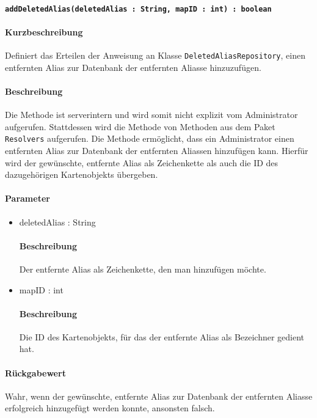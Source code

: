 \paragraph*{\texttt{addDeletedAlias(deletedAlias : String, mapID : int) : boolean}}%
\paragraph*{Kurzbeschreibung}
Definiert das Erteilen der Anweisung an Klasse \texttt{DeletedAliasRepository}, einen entfernten Alias zur Datenbank der entfernten Aliasse hinzuzufügen.
\paragraph*{Beschreibung}
Die Methode ist serverintern und wird somit nicht explizit vom Administrator aufgerufen.
Stattdessen wird die Methode von Methoden aus dem Paket \texttt{Resolvers} aufgerufen.
Die Methode ermöglicht, dass ein Administrator einen entfernten Alias zur Datenbank der entfernten Aliassen hinzufügen kann.
Hierfür wird der gewünschte, entfernte Alias als Zeichenkette als auch die ID des dazugehörigen Kartenobjekts übergeben.
\paragraph*{Parameter}
\begin{itemize}
    \item deletedAlias : String
    		\paragraph*{Beschreibung}
    		Der entfernte Alias als Zeichenkette, den man hinzufügen möchte.
    \item mapID : int
    		\paragraph*{Beschreibung}
    		Die ID des Kartenobjekts, für das der entfernte Alias als Bezeichner gedient hat.
\end{itemize}
\paragraph*{Rückgabewert}
Wahr, wenn der gewünschte, entfernte Alias zur Datenbank der entfernten Aliasse erfolgreich hinzugefügt werden konnte, ansonsten falsch.
